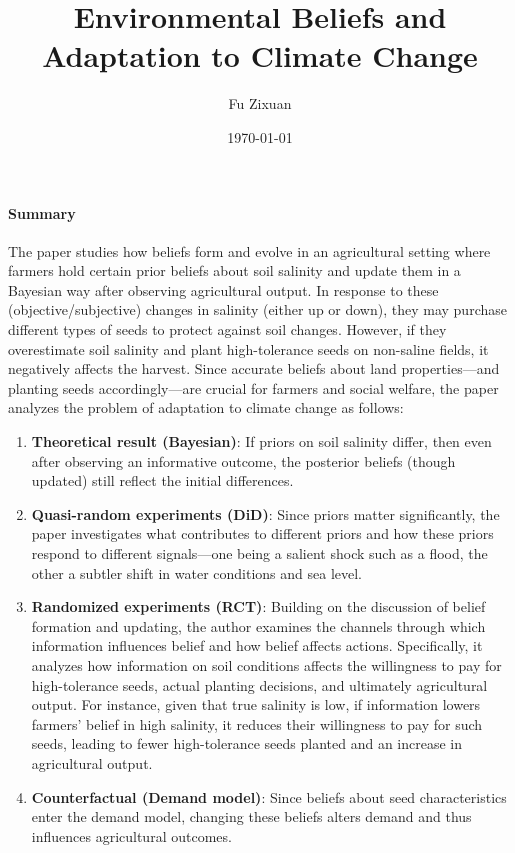 \documentclass[12pt]{article}[margin=1in]
\title{\textbf{Environmental Beliefs and Adaptation to Climate Change}}
\author{Fu Zixuan}
\date{\today}
\begin{document}
\maketitle





\paragraph{Summary} The paper studies how beliefs form and evolve in an agricultural setting where farmers hold certain prior beliefs about soil salinity and update them in a Bayesian way after observing agricultural output. In response to these (objective/subjective) changes in salinity (either up or down), they may purchase different types of seeds to protect against soil changes. However, if they overestimate soil salinity and plant high-tolerance seeds on non-saline fields, it negatively affects the harvest. Since accurate beliefs about land properties—and planting seeds accordingly—are crucial for farmers and social welfare, the paper analyzes the problem of adaptation to climate change as follows:

\begin{enumerate}
    \item \textbf{Theoretical result (Bayesian)}: If priors on soil salinity differ, then even after observing an informative outcome, the posterior beliefs (though updated) still reflect the initial differences.
    \item \textbf{Quasi-random experiments (DiD)}: Since priors matter significantly, the paper investigates what contributes to different priors and how these priors respond to different signals—one being a salient shock such as a flood, the other a subtler shift in water conditions and sea level.
    \item \textbf{Randomized experiments (RCT)}: Building on the discussion of belief formation and updating, the author examines the channels through which information influences belief and how belief affects actions. Specifically, it analyzes how information on soil conditions affects the willingness to pay for high-tolerance seeds, actual planting decisions, and ultimately agricultural output. For instance, given that true salinity is low, if information lowers farmers' belief in high salinity, it reduces their willingness to pay for such seeds, leading to fewer high-tolerance seeds planted and an increase in agricultural output.
    \item \textbf{Counterfactual (Demand model)}: Since beliefs about seed characteristics enter the demand model, changing these beliefs alters demand and thus influences agricultural outcomes.
\end{enumerate}
\end{document}
